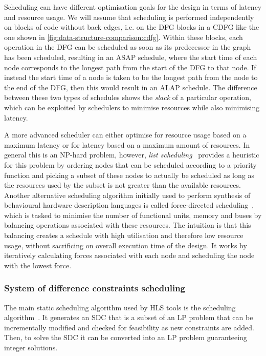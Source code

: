 Scheduling can have different optimisation goals for the design in terms of
latency and resource usage.
We will assume that scheduling is performed independently on blocks of code without back edges, i.e. on the \gls{DFG} blocks in a \gls{CDFG} like the one shown in \cref{fig:data-structure-comparison:cdfg}.
Within these blocks, each operation in the
\gls{DFG} can be scheduled as soon as its predecessor in the graph has been
scheduled, resulting in an \gls{ASAP} schedule, where the start time of each
node corresponds to the longest path from the start of the \gls{DFG} to that
node.  If instead the start time of a node is taken to be the longest path from
the node to the end of the \gls{DFG}, then this would result in an \gls{ALAP}
schedule.  The difference between these two types of schedules shows the
\emph{slack} of a particular operation, which can be exploited by schedulers to
minimise resources while also minimising latency.

A more advanced scheduler can either optimise for resource usage based on a
maximum latency or for latency based on a maximum amount of resources.  In
general this is an NP-hard problem, however, \emph{\gls{list scheduling}}~\cite[][p.~257]{baker19_princ}
provides a heuristic for this problem by ordering nodes that can be scheduled
according to a priority function and picking a subset of these nodes to actually
be scheduled as long as the resources used by the subset is not greater than the
available resources.
Another alternative scheduling algorithm initially used to perform synthesis of behavioural hardware description languages is called force-directed scheduling~\cite{paulin89_fdsbsa}, which is tasked to minimise the number of functional units, memory and buses by balancing operations associated with these resources.
The intuition is that this balancing creates a schedule with high utilisation and therefore low resource usage, without sacrificing on overall execution time of the design.
It works by iteratively calculating forces associated with each node and scheduling the node with the lowest force.

\subsubsection{System of difference constraints scheduling}

The main static scheduling algorithm used by \gls{HLS} tools is the
 scheduling algorithm~\cite{cong06_sdc}.  It
generates an \gls{SDC} that is a subset of an \gls{LP} problem that can be
incrementally modified and checked for feasibility as new constraints are added.
Then, to solve the \gls{SDC} it can be converted into an \gls{LP} problem
guaranteeing integer solutions.

